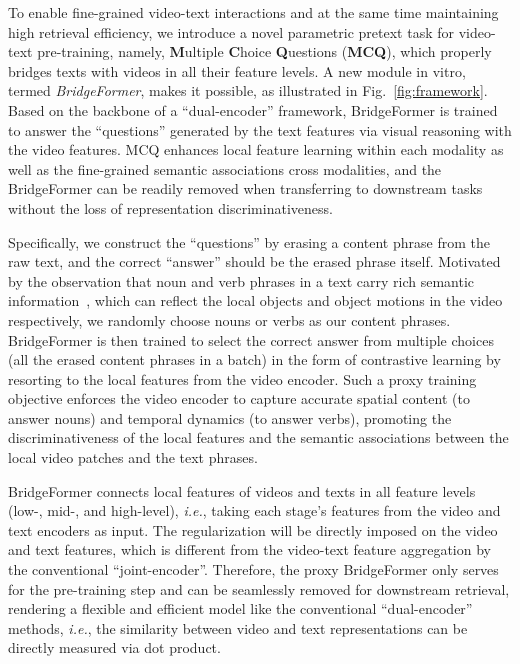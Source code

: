 \documentclass[10pt,twocolumn,letterpaper]{article}
\begin{document}
To enable fine-grained video-text interactions and at the same time maintaining high retrieval efficiency, we introduce a novel parametric pretext task for video-text pre-training, namely, \textbf{M}ultiple \textbf{C}hoice \textbf{Q}uestions (\textbf{MCQ}), which properly bridges texts with videos in all their feature levels.
A new module in vitro, termed \textit{BridgeFormer}, makes it possible, as illustrated in Fig.~\ref{fig:framework}.
Based on the backbone of a ``dual-encoder'' framework, BridgeFormer is trained to answer the ``questions'' generated by the text features via visual reasoning with the video features.
MCQ enhances local feature learning within each modality as well as the fine-grained semantic associations cross modalities, and the BridgeFormer can be readily removed when transferring to downstream tasks without the loss of representation discriminativeness.


Specifically, 
we construct the ``questions'' by erasing a content phrase from the raw text, and the correct ``answer'' should be the erased phrase itself.
Motivated by the observation that noun and verb phrases in a text carry rich semantic information~\cite{taco}, 
which can reflect the local objects and object motions in the video respectively,
we randomly choose nouns or verbs as our content phrases.
BridgeFormer is then trained to select the correct answer from multiple choices (all the erased content phrases in a batch) in the form of contrastive learning by resorting to the local features from the video encoder.
Such a proxy training objective enforces the video encoder to capture accurate spatial content (to answer nouns) and temporal dynamics (to answer verbs), promoting the discriminativeness of the local features and the semantic associations between the local video patches and the text phrases.

BridgeFormer connects local features of videos and texts in all feature levels (low-, mid-, and high-level), \textit{i.e.}, taking each stage's features from the video and text encoders as input.
The regularization will be directly imposed on the video and text features, which is different from the video-text feature aggregation by the conventional ``joint-encoder''.
Therefore, the proxy BridgeFormer only serves for the pre-training step and can be seamlessly removed for downstream retrieval, rendering a flexible and efficient model like the conventional ``dual-encoder'' methods, \textit{i.e.}, the similarity between video and text representations can be directly measured via dot product. 
\end{document}
